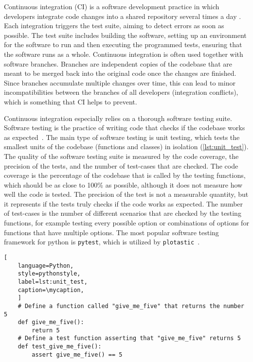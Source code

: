 Continuous integration (CI) is a software development practice in which
developers integrate code changes into a shared repository several times
a day \cite{duvall2007continuous}. Each integration triggers the test
suite, aiming to detect errors as soon as possible. The test suite
includes building the software, setting up an environment for the
software to run and then executing the programmed tests, ensuring that
the software runs as a whole. Continuous integration is often used
together with software branches. Branches are independent copies of the
codebase that are meant to be merged back into the original code once
the changes are finished. Since branches accumulate multiple changes
over time, this can lead to minor incompatibilities between the branches
of all developers (integration conflicts), which is something that CI
helps to prevent.

Continuous integration especially relies on a thorough software testing
suite. Software testing is the practice of writing code that checks if
the codebase works as expected~\cite{10.5555/2161638}. The main type of software testing is
unit testing, which tests the smallest units of the codebase (functions
and classes) in isolation (\autoref{lst:unit_test}). The quality of the
software testing suite is measured by the code coverage, the precision
of the tests, and the number of test-cases that are checked. The code
coverage is the percentage of the codebase that is called by the testing
functions, which should be as close to 100\% as possible, although it
does not measure how well the code is tested. The precision of the test
is not a measurable quantity, but it represents if the tests truly
checks if the code works as expected. The number of test-cases is the
number of different scenarios that are checked by the testing functions,
for example testing every possible option or combinations of options for
functions that have multiple options. The most popular software testing
framework for python is \texttt{pytest}, which is utilized by
\texttt{plotastic}~\cite{pytestx.y}.

\def\mycaption{ Example of an arbitrary python function and its
    respective unit test function. The first function simply returns the
    number 5. The second function tests if the first function indeed returns
    the number 5. The test function is named with the prefix
    ``\texttt{test\_}'' and is placed in a file that ends with the suffix
    ``\texttt{\_test.py}''. The test function is executed by the testing
    framework \texttt{pytest}.}
\begin{lstlisting}[
    language=Python, 
    style=pythonstyle,
    label=lst:unit_test, 
    caption=\mycaption,
    ]
    # Define a function called "give_me_five" that returns the number 5
    def give_me_five():
        return 5
    # Define a test function asserting that "give_me_five" returns 5
    def test_give_me_five():
        assert give_me_five() == 5 
\end{lstlisting}


